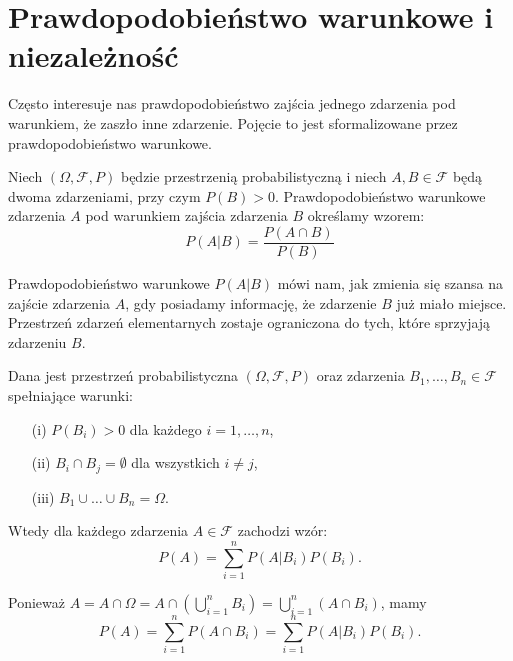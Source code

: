\documentclass[final,a4paper,openany,12pt]{mwbk}
\begin{document}
\section{Prawdopodobieństwo warunkowe i niezależność}
Często interesuje nas prawdopodobieństwo zajścia jednego zdarzenia pod warunkiem, że zaszło inne zdarzenie. Pojęcie to jest sformalizowane przez prawdopodobieństwo warunkowe.

\begin{Def}
    Niech $(\Omega, \mathcal{F}, P)$ będzie przestrzenią probabilistyczną i niech $A, B \in \mathcal{F}$ będą dwoma zdarzeniami, przy czym $P(B) > 0$. Prawdopodobieństwo warunkowe zdarzenia $A$ pod warunkiem zajścia zdarzenia $B$ określamy wzorem:
    $$P(A|B) = \frac{P(A \cap B)}{P(B)}$$
\end{Def}


Prawdopodobieństwo warunkowe $P(A|B)$ mówi nam, jak zmienia się szansa na zajście zdarzenia $A$, gdy posiadamy informację, że zdarzenie $B$ już miało miejsce. Przestrzeń zdarzeń elementarnych zostaje ograniczona do tych, które sprzyjają zdarzeniu $B$.


\begin{Tw}
Dana jest przestrzeń probabilistyczna $(\Omega, \mathcal{F}, P)$ oraz zdarzenia $B_1, \dots, B_n \in \mathcal{F}$ spełniające warunki:
\begin{enumerate}
    \item[(i)] $P(B_i) > 0$ dla każdego $i = 1, \dots, n$,
    \item[(ii)] $B_i \cap B_j = \emptyset$ dla wszystkich $i \neq j$,
    \item[(iii)] $B_1 \cup \dots \cup B_n = \Omega$.
\end{enumerate}
Wtedy dla każdego zdarzenia $A \in \mathcal{F}$ zachodzi wzór:
\[
P(A) = \sum_{i=1}^{n} P(A|B_i)P(B_i).
\]
\end{Tw}
\begin{Dow}
    Ponieważ $A = A \cap \Omega = A \cap (\bigcup_{i=1}^{n} B_i) = \bigcup_{i=1}^{n} (A \cap B_i)$, mamy
\[
P(A) = \sum_{i=1}^{n} P(A \cap B_i) = \sum_{i=1}^{n} P(A|B_i)P(B_i).
\]
\end{Dow}
\end{document}
